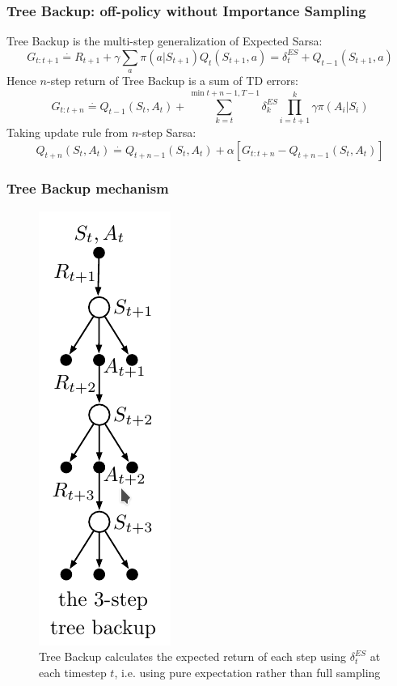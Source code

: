 \documentclass{beamer}
\begin{document}
\begin{frame}
  \frametitle{Tree Backup: off-policy without Importance Sampling}
  Tree Backup is the multi-step generalization of Expected Sarsa:
  $$G_{t : t + 1} \overset{\cdot}{=} R_{t + 1} +
    \gamma \sum_{a} \pi(a | S_{t + 1}) Q_t(S_{t + 1}, a) = \delta^{ES}_t
    + Q_{t - 1}(S_{t + 1}, a)$$
  Hence $n$-step return of Tree Backup is a sum of TD errors:
  $$G_{t : t + n} \overset{\cdot}{=} Q_{t -1}(S_t, A_t) +
    \sum_{k = t}^{\min{t + n - 1, T - 1}} \delta_k^{ES} \prod_{i = t + 1}^k
    \gamma \pi(A_i | S_i)$$
  Taking update rule from $n$-step Sarsa:
  $$Q_{t + n}(S_t, A_t) \overset{\cdot}{=} Q_{t + n - 1}(S_t, A_t) +
    \alpha[G_{t : t + n} - Q_{t + n -1}(S_t, A_t)]$$
\end{frame}

\begin{frame}
  \frametitle{Tree Backup mechanism}
  \begin{figure}
    \centering
    \includegraphics[height=0.7 \textheight]{tree_backup}
    \caption{Tree Backup calculates the expected return of each step using
      $\delta_t^{ES}$ at each timestep $t$, i.e. using pure expectation rather
      than full sampling}
  \end{figure}
\end{frame}
\end{document}
